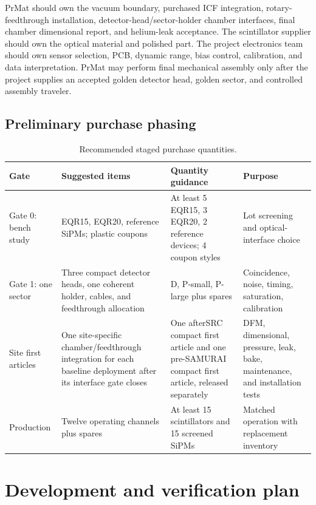 \documentclass[10pt,letterpaper]{article}
\begin{document}
PrMat should own the vacuum boundary, purchased ICF integration, rotary-feedthrough
installation, detector-head/sector-holder chamber interfaces, final chamber dimensional
report, and helium-leak
acceptance. The scintillator supplier should own the optical material and polished part.
The project electronics team should own sensor selection, PCB, dynamic range, bias control,
calibration, and data interpretation. PrMat may perform final mechanical assembly only after
the project supplies an accepted golden detector head, golden sector, and controlled assembly
traveler.

\subsection{Preliminary purchase phasing}

\begin{table}[htbp]
  \centering
  \small
  \caption{Recommended staged purchase quantities.}
  \begin{tabularx}{\textwidth}{L{0.17\textwidth}L{0.25\textwidth}L{0.25\textwidth}Y}
    \toprule
    Gate & Suggested items & Quantity guidance & Purpose \\
    \midrule
    Gate 0: bench study & EQR15, EQR20, reference SiPMs; plastic coupons &
      At least 5 EQR15, 3 EQR20, 2 reference devices; 4 coupon styles &
      Lot screening and optical-interface choice \\
    Gate 1: one sector & Three compact detector heads, one coherent holder, cables, and
      feedthrough allocation &
      D, P-small, P-large plus spares &
      Coincidence, noise, timing, saturation, calibration \\
    Site first articles & One site-specific chamber/feedthrough integration for each baseline
      deployment after its interface gate closes & One afterSRC compact first article and one
      pre-SAMURAI compact first article, released separately &
      DFM, dimensional, pressure, leak, bake, maintenance, and installation tests \\
    Production & Twelve operating channels plus spares &
      At least 15 scintillators and 15 screened SiPMs &
      Matched operation with replacement inventory \\
    \bottomrule
  \end{tabularx}
\end{table}

\section{Development and verification plan}
\label{sec:verification-plan}
\end{document}

